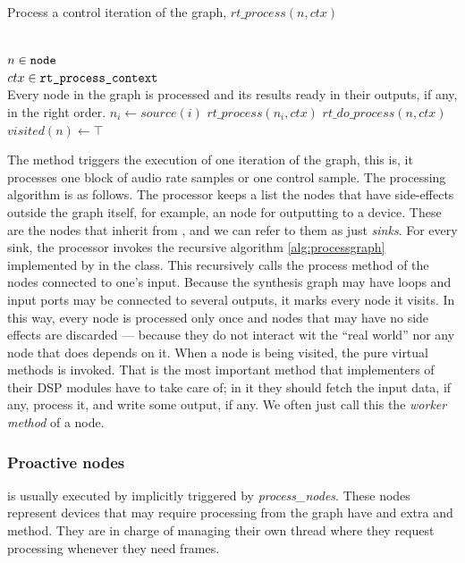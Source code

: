 \begin{algorithm}
  \caption{Process a control iteration of the graph, $rt\_process (n,
    ctx)$}
\label{alg:processgraph}
\begin{algorithmic}
  \REQUIRE $\;$\\
  $n \in \mbox{\texttt{node}}$ \\
  $ctx \in \mbox{\texttt{rt\_process\_context}}$
  \ENSURE $\;$\\Every node in the graph is processed and its results ready in their
  outputs, if any, in the right order.
  \medskip
  \STATE $n_i \gets source (i)$
  \STATE $rt\_process (n_i, ctx)$
  \ENDIF
  \ENDFOR
  \STATE $rt\_do\_process (n, ctx)$
  \STATE $visited (n) \gets \top$
  \ENDIF
\end{algorithmic}
\end{algorithm}

The  method triggers the execution of one
iteration of the graph, this is, it processes one block of audio rate
samples or one control sample. The processing algorithm is as
follows. The processor keeps a list the nodes that have side-effects
outside the graph itself, for example, an node for outputting to a
device. These are the nodes that inherit from , and
we can refer to them as just \emph{sinks}. For every sink, the
processor invokes the recursive algorithm \ref{alg:processgraph}
implemented by  in the  class. This
recursively calls the process method of the nodes connected to one's
input. Because the synthesis graph may have loops and input ports may
be connected to several outputs, it marks every node it visits. In
this way, every node is processed only once and nodes that may have no
side effects are discarded --- because they do not interact wit the
``real world'' nor any node that does depends on it. When a node is
being visited, the pure virtual  methods is
invoked. That is the most important method that implementers of
their DSP modules have to take care of; in it they should fetch the
input data, if any, process it, and write some output, if any. We
often just call this the \emph{worker method} of a node.

\subsubsection{Proactive nodes}

 is usually executed by implicitly triggered by
\emph{process\_nodes}. These nodes represent devices that may require
processing from the graph have and extra  and
 method. They are in charge of managing their own thread
where they request processing whenever they need frames.


